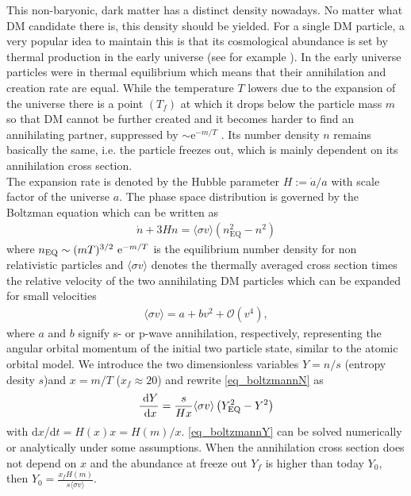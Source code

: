 This non-baryonic, dark matter has a distinct density nowadays. No matter what DM candidate there is, this density should be
yielded. For a single DM particle, a very popular idea to maintain this is that its cosmological abundance is set by thermal production in the 
early universe (see for example \cite{DM-EvCaDo}). In the early universe particles were in thermal equilibrium which means that their annihilation and
creation rate are equal. 
While the temperature $T$ lowers due to the expansion of the universe there is a point $(T_f)$ at which it drops below the particle mass $m$ so that 
DM cannot be further created 
and it becomes harder to find an annihilating partner, suppressed by $\sim \text{e}^{-m/T}$ \cite{LectDMLis}. Its number density $n$ 
remains basically the same, i.e. the particle freezes out, which is mainly dependent on its annihilation cross section.\\
The expansion rate is denoted by the Hubble parameter $H:=\dot{a}/a$ with scale factor of the universe $a$. The phase space distribution is 
governed by the Boltzman equation \cite{DM-EvCaDo} which can be written as 
\begin{align}
 \dot{n} + 3Hn = \langle \sigma v\rangle \left(n_\text{EQ}^2 - n^2\right)
 \label{eq_boltzmannN}
\end{align}
where $n_\text{EQ}\sim (mT)^{3/2}\ \text{e}^{-m/T}$ is the equilibrium number density for non relativistic particles and $\langle\sigma v\rangle$ denotes 
the thermally averaged cross section times the relative velocity of the two annihilating DM particles which can be expanded for small velocities
\begin{align}
 \langle \sigma v \rangle = a + bv^2 + \mathcal{O}(v^4),
\end{align}
where $a$ and $b$ signify s- or p-wave annihilation, respectively, representing the angular orbital momentum of the initial two particle state,
similar to the atomic orbital model. We introduce the two dimensionless variables $Y=n/s$ (entropy desity $s$)and $x=m/T$ ($x_f\approx 20$) 
and rewrite \eqref{eq_boltzmannN} as
\begin{align}
 \frac{\; \mathrm{d} Y}{\; \mathrm{d} x} = \frac{s}{Hx}\langle \sigma v\rangle \left(Y_\text{EQ}^2 - Y^2\right)
 \label{eq_boltzmannY}
\end{align}
with d$x$/d$t = H(x) x = H(m)/x$. \eqref{eq_boltzmannY} can be solved numerically or analytically under some assumptions. When the annihilation
cross section does not depend on $x$ and the abundance at freeze out $Y_f$ is higher than today $Y_0$, then $Y_0=\frac{x_fH(m)}{s \langle \sigma v\rangle}$.
